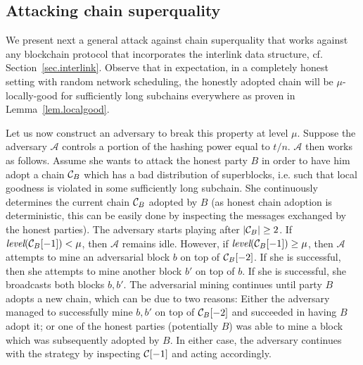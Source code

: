 \subsection{Attacking chain superquality}
\label{subsec.superquality-attack}

We present next a general attack against chain superquality
that works against any blockchain protocol that incorporates
the interlink data structure, cf. Section~\ref{sec.interlink}.
Observe that in expectation, in a
completely honest setting with random network scheduling, the honestly adopted
chain will be $\mu$-locally-good for sufficiently long subchains everywhere as
proven in Lemma~\ref{lem.localgood}.

Let us now construct an adversary to break this property at level $\mu$. Suppose
the adversary $\mathcal{A}$ controls a portion of the hashing power equal to
$t/n$. $\mathcal{A}$ then works as follows. Assume she wants to attack the
honest party $B$ in order to have him adopt a chain $\mathcal{C}_B$ which has a bad
distribution of superblocks, i.e. such that local goodness is violated in some
sufficiently long subchain. She continuously determines the current chain
$\mathcal{C}_B$ adopted by $B$ (as honest chain adoption is deterministic, this can
be easily done by inspecting the messages exchanged by the honest parties). The
adversary starts playing after $|\mathcal{C}_B| \geq 2$. If
$\textit{level}(\mathcal{C}_B[-1]) < \mu$, then $\mathcal{A}$ remains idle. However,
if $\textit{level}(\mathcal{C}_B[-1]) \geq \mu$, then $\mathcal{A}$ attempts to mine
an adversarial block $b$ on top of $\mathcal{C}_B[-2]$. If she is successful, then she
attempts to mine another block $b'$ on top of $b$. If she is successful, she
broadcasts both blocks $b, b'$. The adversarial mining continues until party $B$
adopts a new chain, which can be due to two reasons: Either the adversary
managed to successfully mine $b, b'$ on top of $\mathcal{C}_B[-2]$ and succeeded in
having $B$ adopt it; or one of the honest parties (potentially $B$) was able to
mine a block which was subsequently adopted by $B$. In either case, the
adversary continues with the strategy by inspecting $\mathcal{C}[-1]$ and acting
accordingly.


